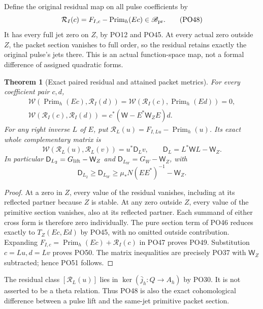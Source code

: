 \documentclass[11pt]{article}
\newtheorem{theorem}{Theorem}[section]
\newcommand{\B}{\mathscr B}
\begin{document}
Define the original residual map on all pulse coefficients by
\[
 \mathcal R_I(c)=F_{I,c}-\operatorname{Prim}_h(Ec)\in\B_{\rm pr}.
 \tag{PO48}\label{po:residual}
\]
It has every full jet zero on \(Z\), by PO12 and PO45.
At every actual zero outside \(Z\), the packet section vanishes
to full order, so the residual retains exactly the original
pulse's jets there. This is an actual function-space map,
not a formal difference of assigned quadratic forms.

\begin{theorem}[Exact paired residual and attained packet metrics]
\label{thm:residual}
For every coefficient pair \(c,d\),
\[
 \begin{gathered}
 \mathcal W(\operatorname{Prim}_h(Ec),\mathcal R_I(d))
 =\mathcal W(\mathcal R_I(c),\operatorname{Prim}_h(Ed))=0,\\
 \mathcal W(\mathcal R_I(c),\mathcal R_I(d))
      =c^*(\mathsf W-E^*\mathsf W_ZE)d .
 \end{gathered}
 \tag{PO49}\label{po:orthogonal}
\]
For any right inverse \(L\) of \(E\), put
\(\mathcal R_L(u)=F_{I,Lu}-\operatorname{Prim}_h(u)\).
Its exact whole complementary matrix is
\[
 \mathcal W(\mathcal R_L(u),\mathcal R_L(v))
       =u^*\mathsf D_Lv,\qquad
 \boxed{\mathsf D_L=L^*\mathsf W L-\mathsf W_Z.}
 \tag{PO50}\label{po:complement}
\]
In particular
\(\mathsf D_{L_2}=G_{\rm lift}-\mathsf W_Z\) and
\(\mathsf D_{L_W}=G_W-\mathsf W_Z\), with
\[
 \mathsf D_{L_2}\ge\mathsf D_{L_W}
       \ge\mu_*N(EE^*)^{-1}-\mathsf W_Z .
 \tag{PO51}\label{po:residual-lower}
\]
\end{theorem}
\begin{proof}
At a zero in \(Z\), every value of the residual vanishes,
including at its reflected partner because \(Z\) is stable.
At any zero outside \(Z\), every value of the primitive section
vanishes, also at its reflected partner.
Each summand of either cross form is therefore zero individually.
The pure section term of PO46 reduces exactly to \(T_Z(Ec,Ed)\)
by PO45, with no omitted outside contribution.
Expanding \(F_{I,c}=\operatorname{Prim}_h(Ec)+\mathcal R_I(c)\)
in PO47 proves PO49. Substitution \(c=Lu,d=Lv\) proves PO50.
The matrix inequalities are precisely PO37 with
\(\mathsf W_Z\) subtracted; hence PO51 follows.
\end{proof}

The residual class \([\mathcal R_L(u)]\) lies in
\(\ker(\bar j_h:Q\to A_h)\) by PO30.
It is not asserted to be a theta relation. Thus PO48 is also
the exact cohomological difference between a pulse lift and
the same-jet primitive packet section.
\end{document}

